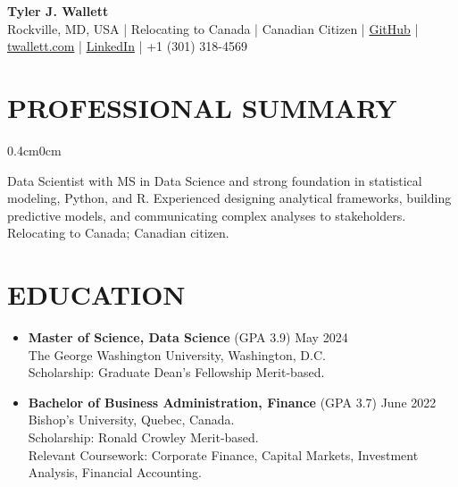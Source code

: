 \documentclass[a4paper,9pt]{extarticle}
\begin{document}
\thispagestyle{firstpage}

\begin{center}
\textbf{\Huge Tyler J. Wallett }\\[3pt] %
Rockville, MD, USA | Relocating to Canada | Canadian Citizen | \href{https://github.com/twallett}{GitHub} | \href{https://www.twallett.com}{twallett.com} | \href{https://www.linkedin.com/in/twallett/}{LinkedIn} | +1 (301) 318-4569  %
\end{center}

\section*{PROFESSIONAL SUMMARY}

\begin{adjustwidth}{0.4cm}{0cm}

Data Scientist with MS in Data Science and strong foundation in statistical modeling, Python, and R. Experienced designing analytical frameworks, building predictive models, and communicating complex analyses to stakeholders. Relocating to Canada; Canadian citizen.

\end{adjustwidth}

\section*{EDUCATION}

\begin{itemize}[leftmargin=0.4cm, label={}]
    \item \textbf{Master of Science, Data Science} (GPA 3.9) \hfill May 2024 \\ 
    The George Washington University, Washington, D.C. \\ 
    Scholarship: Graduate Dean's Fellowship Merit-based.
\end{itemize}

\noindent
\begin{itemize}[leftmargin=0.4cm, label={}]
    \item \textbf{Bachelor of Business Administration, Finance} (GPA 3.7) \hfill June 2022 \\
    Bishop's University, Quebec, Canada. \\ 
    Scholarship: Ronald Crowley Merit-based. \\
    Relevant Coursework: Corporate Finance, Capital Markets, Investment Analysis, Financial Accounting.
\end{itemize}
\end{document}
